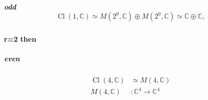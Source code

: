 \documentclass[aps,preprint]{revtex4}%
\begin{document}
\subparagraph{odd%
\begin{equation}
\operatorname*{Cl}\left(  1,\mathbb{C}\right)  \simeq M\left(  2^{0}%
,\mathbb{C}\right)  \oplus M\left(  2^{0},\mathbb{C}\right)  \simeq
\mathbb{C}\oplus\mathbb{C},
\end{equation}
}

\paragraph{r=2 then}

\subparagraph{even}%

\begin{align}
\operatorname*{Cl}\left(  4,\mathbb{C}\right)   &  \simeq M\left(
4,\mathbb{C}\right) \\
M\left(  4,\mathbb{C}\right)   &  :\mathbb{C}^{4}\rightarrow\mathbb{C}^{4}%
\end{align}
\end{document}
